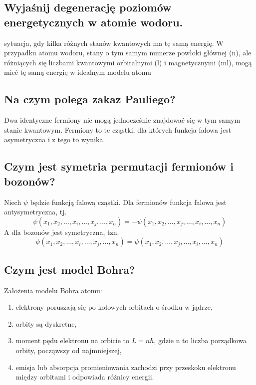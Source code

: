 \subsection{Wyjaśnij degenerację poziomów energetycznych w atomie wodoru.}

sytuacja, gdy kilka różnych stanów kwantowych ma tę samą energię. W przypadku atomu wodoru, stany o tym samym numerze powłoki głównej (n), ale różniących się liczbami kwantowymi orbitalnymi (l) i magnetycznymi (ml), mogą mieć tę samą energię w idealnym modelu atomu

\subsection{Na czym polega zakaz Pauliego?}

Dwa identyczne fermiony nie mogą jednocześnie znajdować się w tym samym stanie kwantowym. Fermiony to te cząstki, dla których funkcja falowa jest asymetryczna i z tego to wynika.

\subsection{Czym jest symetria permutacji fermionów i bozonów?}

Niech \(\psi\) będzie funkcją falową cząstki.
Dla fermionów funkcja falowa jest antysymetryczna, tj.
\[\psi(x_1 , x_2,\ldots, x_i, \ldots, x_j ,\ldots, x_n) = -\psi(x_1 , x_2,\ldots, x_j, \ldots, x_i ,\ldots, x_n)\]
A dla bozonów jest symetryczna, tzn.
\[\psi(x_1 , x_2,\ldots, x_i, \ldots, x_j ,\ldots, x_n ) = \psi(x_1 , x_2,\ldots, x_j, \ldots, x_i ,\ldots, x_n)\]


\subsection{Czym jest model Bohra?}

Założenia modelu Bohra atomu:
\begin{enumerate}
    \item elektrony poruszają się po kołowych orbitach o środku w jądrze,
    \item orbity są dyskretne,
    \item moment pędu elektronu na orbicie to \(L = n \hbar\), gdzie n to liczba porządkowa orbity, począwszy od najmniejszej,
    \item emisja lub absorpcja promieniowania zachodzi przy przeskoku elektronu między orbitami i odpowiada różnicy energii.
\end{enumerate}

